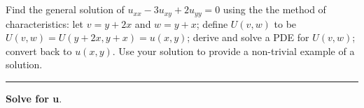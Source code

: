 \documentclass[10pt]{article}
\begin{document}
\newpage


\section{\underline{}}
\label{sec: Problem 6}

\noindent
Find the general solution of $ \displaystyle u_{xx} - 3u_{xy} + 2u_{yy} = 0 $ using the  the method of characteristics:
let $ \displaystyle v = y + 2x $ and $ \displaystyle w = y + x $;
define $ \displaystyle U(v,w) $ to be $ \displaystyle U(v,w) = U(y + 2x,y + x) = u(x,y) $;
derive and solve a PDE for $ \displaystyle U(v,w) $;
convert back to $ \displaystyle u(x,y) $.
Use your solution to provide a non-trivial example of a solution. \\
\vspace{2.5mm}

\hrule

\vspace{7.5mm}

\noindent
\textbf{Solve for u}. \\
\end{document}

